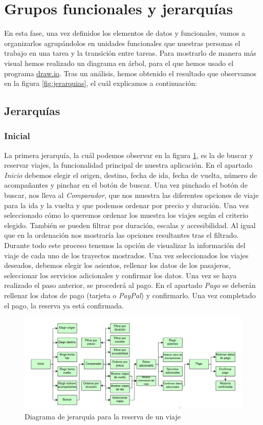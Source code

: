 \section{Grupos funcionales y jerarquías}

En esta fase, una vez definidos los elementos de datos y funcionales, vamos a
organizarlos agrupándolos en unidades funcionales que nuestras personas el
trabajo en una tarea y la transición entre tareas. Para mostrarlo de manera más
visual hemos realizado un diagrama en árbol, para el que hemos usado el
programa \underline{\href{https://www.drawio.com/}{draw.io}}. Tras un análisis, 
hemos obtenido el resultado que observamos en la figura \ref{fig:jerarquias}, el cuál explicamos a 
continuación:

\subsection{Jerarquías}

\subsubsection*{Inicial}

La primera jerarquía, la cuál podemos observar en la figura \ref{fig:jerarquias1}, es la de buscar y
reservar viajes, la funcionalidad principal de nuestra aplicación. En el apartado \textit{Inicio}
debemos elegir el origen, destino, fecha de ida, fecha de vuelta, número de
acompañantes y pinchar en el botón de buscar. Una vez pinchado el botón de buscar, nos lleva al
\textit{Comparador}, que nos muestra las diferentes opciones de viaje para la ida y la vuelta y que podemos
ordenar por precio y duración. Una vez seleccionado cómo lo queremos ordenar los muestra los viajes
según el criterio elegido. También se pueden filtrar por duración, escalas y accesibilidad. Al
igual que en la ordenación nos mostraría las opciones resultantes tras el filtrado. Durante todo
este proceso tenemos la opción de visualizar la información del viaje de cada uno de
los trayectos mostrados. Una vez seleccionados los viajes deseados, debemos elegir los asientos,
rellenar los datos de los pasajeros, seleccionar los servicios adicionales y confirmar los datos.
Una vez se haya realizado el paso anterior, se procederá al pago. En el apartado \textit{Pago} se
deberán rellenar los datos de pago (tarjeta o \textit{PayPal}) y confirmarlo. Una vez completado el pago,
la reserva ya está confirmada.

\begin{figure}
      \centering
      \includegraphics[width=0.8\linewidth]{./Imagenes/jerarquia-viaje.png}
      \caption{Diagrama de jerarquía para la reserva de un viaje}
      \label{fig:jerarquias1}
\end{figure}

